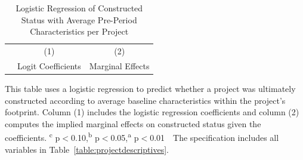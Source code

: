 \documentclass[12pt]{article}
\begin{document}



\begin{table}[ht!]
\small
\centering
\caption{Logistic Regression of Constructed Status with Average Pre-Period Characteristics per Project}\label{table:pweight}
\vspace{-2mm}
\begin{threeparttable}
\begin{tabular}{lCC}
\toprule
& (1) & (2) \\{}
& Logit Coefficients & Marginal Effects \\
\midrule

\bottomrule
\end{tabular}
\begin{tablenotes}
\item \footnotesize This table uses a logistic regression to predict whether a project was ultimately constructed according to average baseline characteristics within the project's footprint.  Column (1) includes the logistic regression coefficients and column (2) computes the implied marginal effects on constructed status given the coefficients.
\textsuperscript{c} p$<$0.10,\textsuperscript{b} p$<$0.05,\textsuperscript{a} p$<$0.01 \,\,  The specification includes all variables in Table~\ref{table:projectdescriptives}.
\end{tablenotes}
\end{threeparttable}
\end{table}
\end{document}
